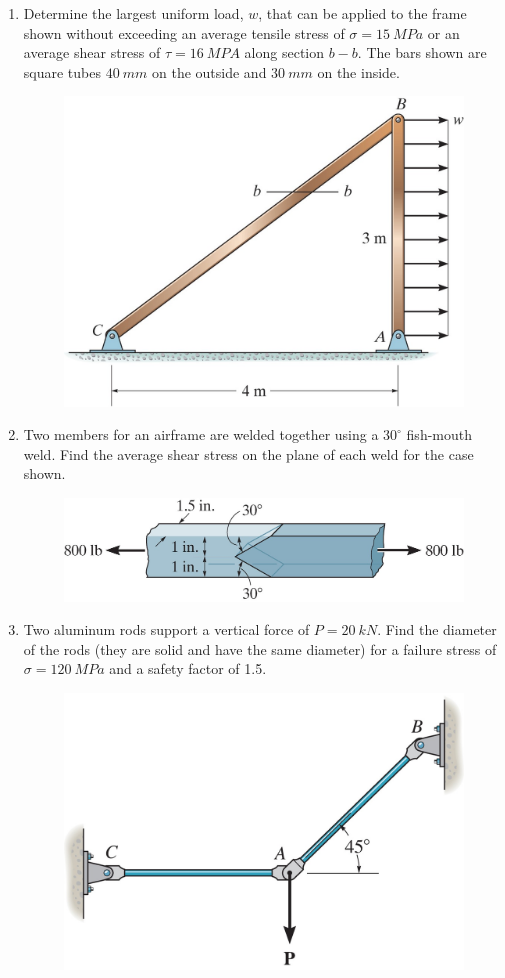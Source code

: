 \documentclass[12pt, oneside]{article}
\begin{document}
\begin{enumerate}
	\item %
		Determine the largest uniform load, $w$, that can be applied to the frame shown without exceeding an average tensile stress of $\sigma = \SI{15}{MPa}$ or an average shear stress of $\tau = \SI{16}{MPA}$ along section $b-b$.
		The bars shown are square tubes $\SI{40}{mm}$ on the outside and $\SI{30}{mm}$ on the inside.
		\begin{figure}[H]
			\centering
			\includegraphics[width=0.6\linewidth]{truss}
			\label{fig:truss}
		\end{figure}
		\pagebreak
	
	\item %
		Two members for an airframe are welded together using a $30^\circ$ fish-mouth weld.
		Find the average shear stress on the plane of each weld for the case shown.
		\begin{figure}[H]
			\centering
			\includegraphics[width=0.6\linewidth]{fish-mouth}
			\label{fig:fish-mouth}
		\end{figure}

	\item %
		Two aluminum rods support a vertical force of $P=\SI{20}{kN}$.
		Find the diameter of the rods (they are solid and have the same diameter) for a failure stress of $\sigma=\SI{120}{MPa}$ and a safety factor of 1.5.
		\begin{figure}[H]
			\centering
			\includegraphics[width=0.6\linewidth]{rods}
			\label{fig:rods}
		\end{figure}
		\pagebreak


\end{enumerate}
\end{document}
